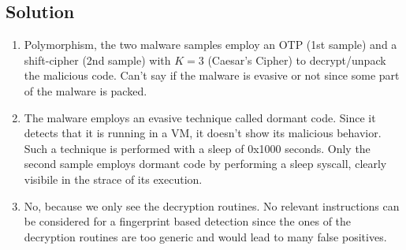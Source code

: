 \subsection*{Solution}
\begin{enumerate}
    \item Polymorphism, the two malware samples employ an OTP (1st sample) and a shift-cipher (2nd sample) with $K = 3$ (Caesar's Cipher) to decrypt/unpack the malicious code.
        Can't say if the malware is evasive or not since some part of the malware is packed.
    \item The malware employs an evasive technique called dormant code.
        Since it detects that it is running in a VM, it doesn't show its malicious behavior. 
        Such a technique is performed with a sleep of 0x1000 seconds.
        Only the second sample employs dormant code by performing a sleep syscall, clearly visibile in the strace of its execution.
    \item No, because we only see the decryption routines.
        No relevant instructions can be considered for a fingerprint based detection since the ones of the decryption routines are too generic and would lead to many false positives.
\end{enumerate}
